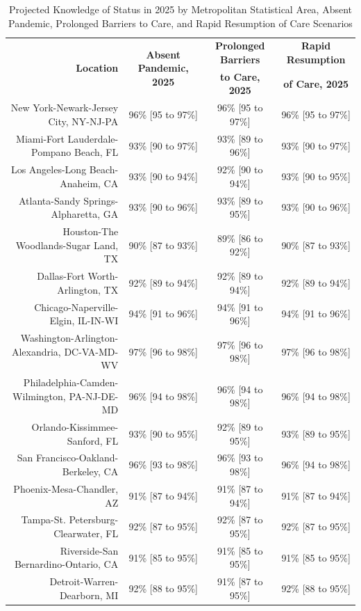\documentclass{article}
\begin{document}
\begin{table}[H]
	\caption{Projected Knowledge of Status in 2025 by Metropolitan Statistical Area, Absent Pandemic, Prolonged Barriers to Care, and Rapid Resumption of Care Scenarios}
	\footnotesize
	\begin{tabular}{|r|c|c|c|}
		\hline
		\multirow{2}{*}{\textbf{Location}} & \multirow{2}{*}{\textbf{Absent Pandemic, 2025}} & \textbf{Prolonged Barriers} & \textbf{Rapid Resumption}\\
		&  & \textbf{to Care, 2025} & \textbf{of Care, 2025}\\
		\hline\hline
		New York-Newark-Jersey City, NY-NJ-PA & 96\% [95 to 97\%] & 96\% [95 to 97\%] & 96\% [95 to 97\%]\\
		Miami-Fort Lauderdale-Pompano Beach, FL & 93\% [90 to 97\%] & 93\% [89 to 96\%] & 93\% [90 to 97\%]\\
		Los Angeles-Long Beach-Anaheim, CA & 93\% [90 to 94\%] & 92\% [90 to 94\%] & 93\% [90 to 95\%]\\
		Atlanta-Sandy Springs-Alpharetta, GA & 93\% [90 to 96\%] & 93\% [89 to 95\%] & 93\% [90 to 96\%]\\
		Houston-The Woodlands-Sugar Land, TX & 90\% [87 to 93\%] & 89\% [86 to 92\%] & 90\% [87 to 93\%]\\
		Dallas-Fort Worth-Arlington, TX & 92\% [89 to 94\%] & 92\% [89 to 94\%] & 92\% [89 to 94\%]\\
		Chicago-Naperville-Elgin, IL-IN-WI & 94\% [91 to 96\%] & 94\% [91 to 96\%] & 94\% [91 to 96\%]\\
		Washington-Arlington-Alexandria, DC-VA-MD-WV & 97\% [96 to 98\%] & 97\% [96 to 98\%] & 97\% [96 to 98\%]\\
		Philadelphia-Camden-Wilmington, PA-NJ-DE-MD & 96\% [94 to 98\%] & 96\% [94 to 98\%] & 96\% [94 to 98\%]\\
		Orlando-Kissimmee-Sanford, FL & 93\% [90 to 95\%] & 92\% [89 to 95\%] & 93\% [89 to 95\%]\\
		San Francisco-Oakland-Berkeley, CA & 96\% [93 to 98\%] & 96\% [93 to 98\%] & 96\% [94 to 98\%]\\
		Phoenix-Mesa-Chandler, AZ & 91\% [87 to 94\%] & 91\% [87 to 94\%] & 91\% [87 to 94\%]\\
		Tampa-St. Petersburg-Clearwater, FL & 92\% [87 to 95\%] & 92\% [87 to 95\%] & 92\% [87 to 95\%]\\
		Riverside-San Bernardino-Ontario, CA & 91\% [85 to 95\%] & 91\% [85 to 95\%] & 91\% [85 to 95\%]\\
		Detroit-Warren-Dearborn, MI & 92\% [88 to 95\%] & 91\% [87 to 95\%] & 92\% [88 to 95\%]\\

\end{tabular}
\end{table}
\end{document}
